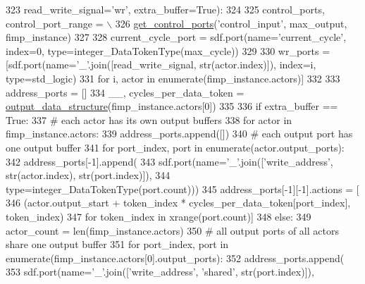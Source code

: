 \begin{DoxyCode}
323                          read\_write\_signal=\textcolor{stringliteral}{'wr'}, extra\_buffer=\textcolor{keyword}{True}):
324 
325     control\_ports, control\_port\_range = \(\backslash\)
326         \hyperlink{namespacesylva_1_1code__generation_1_1air_a71d379169f113b29c326aa9f70c6d47e}{get\_control\_ports}(\textcolor{stringliteral}{'control\_input'}, max\_output, fimp\_instance)
327 
328     current\_cycle\_port = sdf.port(name=\textcolor{stringliteral}{'current\_cycle'}, index=0, type=integer\_DataTokenType(max\_cycle))
329 
330     wr\_ports = [sdf.port(name=\textcolor{stringliteral}{'\_'}.join([read\_write\_signal, str(actor.index)]), index=i, type=std\_logic)
331                 \textcolor{keywordflow}{for} i, actor \textcolor{keywordflow}{in} enumerate(fimp\_instance.actors)]
332 
333     address\_ports = []
334     \_\_, cycles\_per\_data\_token = \hyperlink{namespacesylva_1_1code__generation_1_1air_a83186b3b999778cee36ac81d42b2cd44}{output\_data\_structure}(fimp\_instance.actors[0])
335 
336     \textcolor{keywordflow}{if} extra\_buffer == \textcolor{keyword}{True}:
337         \textcolor{comment}{# each actor has its own output buffers}
338         \textcolor{keywordflow}{for} actor \textcolor{keywordflow}{in} fimp\_instance.actors:
339             address\_ports.append([])
340             \textcolor{comment}{# each output port has one output buffer}
341             \textcolor{keywordflow}{for} port\_index, port \textcolor{keywordflow}{in} enumerate(actor.output\_ports):
342                 address\_ports[-1].append(
343                     sdf.port(name=\textcolor{stringliteral}{'\_'}.join([\textcolor{stringliteral}{'write\_address'}, str(actor.index), str(port.index)]),
344                              type=integer\_DataTokenType(port.count)))
345                 address\_ports[-1][-1].actions = [
346                     (actor.output\_start + token\_index * cycles\_per\_data\_token[port\_index], token\_index)
347                     \textcolor{keywordflow}{for} token\_index \textcolor{keywordflow}{in} xrange(port.count)]
348     \textcolor{keywordflow}{else}:
349         actor\_count = len(fimp\_instance.actors)
350         \textcolor{comment}{# all output ports of all actors share one output buffer}
351         \textcolor{keywordflow}{for} port\_index, port \textcolor{keywordflow}{in} enumerate(fimp\_instance.actors[0].output\_ports):
352             address\_ports.append(
353                 sdf.port(name=\textcolor{stringliteral}{'\_'}.join([\textcolor{stringliteral}{'write\_address'}, \textcolor{stringliteral}{'shared'}, str(port.index)]),

\end{DoxyCode}
